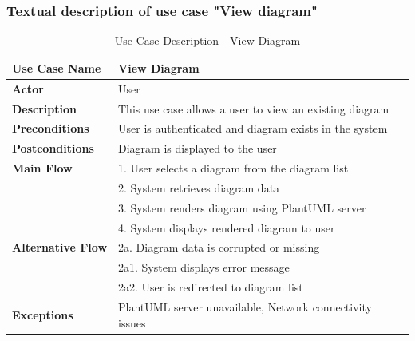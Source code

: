 \subsubsection{Textual description of use case "View diagram"}
\begin{table}[H]
\centering
\caption{Use Case Description - View Diagram}
\begin{tabular}{|l|p{10cm}|}
\hline
\textbf{Use Case Name} & View Diagram \\
\hline
\textbf{Actor} & User \\
\hline
\textbf{Description} & This use case allows a user to view an existing diagram \\
\hline
\textbf{Preconditions} & User is authenticated and diagram exists in the system \\
\hline
\textbf{Postconditions} & Diagram is displayed to the user \\
\hline
\textbf{Main Flow} & 1. User selects a diagram from the diagram list \\
& 2. System retrieves diagram data \\
& 3. System renders diagram using PlantUML server \\
& 4. System displays rendered diagram to user \\
\hline
\textbf{Alternative Flow} & 2a. Diagram data is corrupted or missing \\
& 2a1. System displays error message \\
& 2a2. User is redirected to diagram list \\
\hline
\textbf{Exceptions} & PlantUML server unavailable, Network connectivity issues \\
\hline
\end{tabular}
\end{table}

